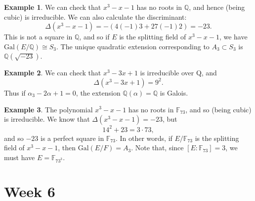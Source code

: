 \documentclass[12pt]{report}
\newtheorem{thm}{Theorem}[section]
\theoremstyle{definition}
\newtheorem{example}[thm]{Example}
\def\ZZ{\mathbb{Z}}
\def\QQ{\mathbb{Q}}
\def\FF{\mathbb{F}}
\def\aa{\alpha}
\def\Gal{\text{Gal}}
\begin{document}
\begin{example}
    We can check that $x^3 - x - 1$ has no roots in $\QQ$, and hence (being cubic) is irreducible. We can also calculate the discriminant:
    $$\Delta(x^3 - x - 1) = -(4(-1)3 + 27(-1)2) = -23.$$
    This is not a square in $\QQ$, and so if $E$ is the splitting field of $x^3 - x - 1$, we have $\Gal(E/\QQ) \cong S_3$. The unique quadratic extension corresponding to $A_3 \subset S_3$ is $\QQ(\sqrt{-23})$.
\end{example}

\begin{example}
    We can check that $x^3 - 3x + 1$ is irreducible over Q, and
    $$\Delta(x^3 - 3x + 1) = 9^2.$$
    Thus if $\aa_3 - 2\aa + 1 = 0$, the extension $\QQ(\aa)=\QQ$ is Galois.
\end{example}

\begin{example}
    The polynomial $x^3 -x-1$ has no roots in $\FF_{73}$, and so (being cubic) is irreducible. We know that $\Delta(x^3 - x - 1) = -23$, but
    $$14^2 + 23 = 3 \cdot 73,$$ and so $-23$ is a perfect square in $\FF_{73}$. In other words, if $E/\FF_{73}$ is the splitting field of $x^3 - x - 1$, then $\Gal(E/F) = A_3$. Note that, since $[E : \FF_{73}] = 3$, we must have $E = \FF_{73^3}$.
\end{example}


\chapter*{Week 6}
\setcounter{chapter}{6}


\end{document}
